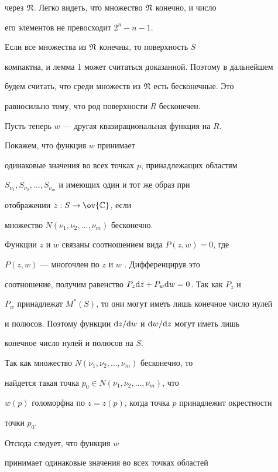 \begin{pf}
через $\frak N$. Легко видеть, что множество $\frak N$ конечно, и число


его элементов не превосходит $2^n-n-1$.





Если все множества из $\frak N$ конечны, то поверхность $S$


компактна, и лемма 1 может считаться доказанной. Поэтому в дальнейшем


будем считать, что среди множеств из $\frak N$ есть бесконечные. Это


равносильно тому, что род поверхности $R$ бесконечен.





Пусть теперь $w$ --- другая квазирациональная функция на $R$.


Покажем, что функция $w$ принимает


одинаковые значения во всех точках $p$, принадлежащих областям


$S_{\nu_1}, S_{\nu_2},\dotsc,S_{\nu_m}$ и имеющих один и тот же образ при


отображении $z: S\to \ov{\Bbb C}$, если


множество $N(\nu_1, \nu_2,\dotsc,\nu_m)$ бесконечно.





Функции $z$ и $w$ связаны соотношением вида $P(z,w)=0$, где


$P(z,w)$ --- многочлен по $z$ и $w$ \cite{Myr}. Дифференцируя это


соотношение, получим равенство $P_z\mathrm d z+P_w\mathrm d w =0$. Так как $P_z$ и


$P_w$ принадлежат $M^*(S)$, то они могут иметь лишь конечное число нулей


и полюсов. Поэтому функции $\mathrm d z/\mathrm d w$ и $\mathrm d w/\mathrm d z$ могут иметь лишь


конечное число нулей и полюсов на $S$.


Так как множество $N(\nu_1, \nu_2,\dotsc,\nu_m)$ бесконечно, то


найдется такая точка $p_0\in N(\nu_1,\nu_2,\dotsc,\nu_m)$, что


$w(p)$ голоморфна по $z=z(p)$, когда точка $p$ принадлежит окрестности


точки $p_0$.


Отсюда следует, что функция $w$


принимает одинаковые значения во всех точках областей



\end{pf}
